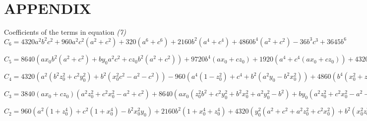 \chapter{APPENDIX} %

\label{Appendix} %


Coefficients of the terms in equation \textit{(7)} \\

$C_6  = 4320a^2b^2c^2 + 960a^2c^2(a^2 + c^2) + 320(a^6 + c^6) + 2160b^2(a^4 + c^4) + 4860b^4(a^2 
+ c^2) - 36b^3c^3 + 3645b^6$
  
$C_5  = 8640(ax_0b^2(a^2 + c^2) + by_0a^2c^2  + cz_0b^2(a^2 + c^2)) + 9720b^4(ax_0 + cz_0) + 1920(a^4 
+ c^4(ax_0 + cz_0)) + 4320(a^4 + c^4by_0) + 3840(a^2 + c^2)(ax_0 + cz_0) + 19440(c^2b^2 + ab^2) 
by_0 -­ 108bc(c^2by_0 + cz_0b^2) -­ 320a^2ba^3 + 21870y_0b^5$  

$C_4  = 4320(a^2(b^2z_0^2 + c^2y_0^2) + b^2(x_0^2c^2 - a^2 - c^2)) -­ 960(a^4(1 -­ z_0^2) + c^4 + b^2(a^2y_0 ­- 
b^2x_0^2)) + 4860(b^4(x_0^2 + z_0^2 -­ 1)) + 4800(a^4x_0^2 + c^4z_0^2)+ 2160y_0^2(a^4 + c^4) + 
5760a^2c^2(x_0^2 + z_0^2) + 7680ax_0cz_0(a^2 + c^2) + 17280((ax_0by_0 + by_0cz_0 )(a^2 + c^2) + 
ax_0cz_0b^2) + 12960b^2(a^4x_0^2 + c^4z_0^2) + 29160b^2y_0^2(a^2 + c^2) -­ 108bc(b^2z_0^2 + c^2y_0^2)
- 1920a^2c^2 -­ 54675y_0^2b^4 -­ 324z_0c^2b^2y_0 - 640ax_0b^3$    

$C_3 = 3840(ax_0 + cz_0)(a^2z_0^2 + c^2x_0^2 - a^2 + c^2) + 8640(ax_0(z_0^2b^2 + c^2y_0^2 + b^2x_0^2 + 
a^2y_0^2 -­ b^2) + by_0(a^2z_0^2 + c^2x_0^2 - a^2 - c^2) + cz_0(a^2y_0^2 + b^2x_0^2 + bz_0^2 + c^2y_0^2 - ­ b^2)) + 6400 
(a^3x_0^3 + c^3z_0^3) + 19440by_0(b^2(x_0^2 + z_0^2 -­ 1) + y_0^2(a^2 + c^2)) -­ 36(b^3z_0^3 + c^3y_0^3 ) + 
11520(ax_0cz_0(ax_0 + cz_0))­ - 324by_0cz_0(bz_0 + c + y_0) + 25920by_0(z_0^2c^2 + x_0^2a^2) ­- 
320x_0^2b^3  + 72900y_0^3b^3 + 34560ax_0by_0cz_0 + 58320ax_0b^2y_0^2 -­ 1920ax_0b^2y_0 + 
58320cz_0b^2y_0  -­ 960a^2by_0^2$

$C_2 = 960(a^2(1 + z_0^4) +  c^2(1 + x_0^4) - b^2x_0^2y_0) + 2160b^2(1 + x_0^4 + z_0^4) + 4320(y_0^2( 
a^2 + c^2 + a^2z_0^2 + c^2x_0^2) + b^2(x_0^2z_0^2 - x_0^2­ - z_0^2)) + 4800(x_0^3a^2 + z_0^3c^2)
 + 4860y_0^4(a^2 + c^2) + 5760(z_0^2c^2(1 + x_0^2) + x_0^2a^2(z_0^2 - ­1)) + 7680ax_0cz_0(x_0^2 + z_0^2 - 1­ - 1920(a^2z_0^2 + c^2x_0^2 + ax_0y_0^2b) + 17280(by_0(ax_0^3 - ax_0 + cz_0^3 -­ cz_0 + az_0^2) + ax_0cz_0y_0^2) + 38880bz_0^3(ax_0 + cz_0) + 12960y_0^2(a^2x_0^2 ­- c^2z_0^2) + 
29160b^2y_0^2(x_0^2 + z_0^2 -­ 1) ­- 180y_0z_0c^2y_0^2 + b^2z_0^2) ­- 320a^2y_0^3 + 54675y_0^3b^2$  

